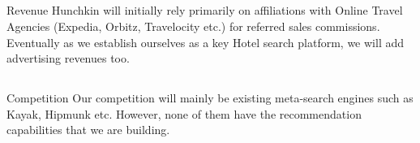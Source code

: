 \documentclass[DIV=calc, paper=a4, fontsize=11pt, twocolumn]{scrartcl}	 %
\newcommand{\initial}[1]{ %
\lettrine[lines=2,lhang=0.1,nindent=0em]{
\color{DarkGoldenrod}
{\textsf{#1}}}{}}
\begin{document}
\subsection*{}

\initial{Revenue }
Hunchkin will initially rely primarily on affiliations with Online Travel Agencies (Expedia, Orbitz, Travelocity etc.) for referred sales commissions. Eventually as we establish ourselves as a key Hotel search platform, we will add advertising revenues too.


\subsection*{}

\initial{Competition }
Our competition will mainly be existing meta-search engines such as Kayak, Hipmunk etc. However, none of them have the recommendation capabilities that we are building. 
\end{document}
